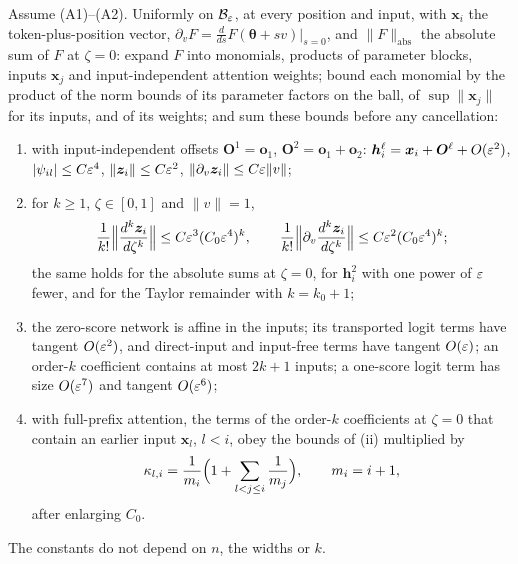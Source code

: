 \begin{proposition}
\label{prop:network}
Assume (A1)--(A2). Uniformly on $\mathcal B_{\varepsilon}$, at every position and input, with $\bm x_i$ the token-plus-position vector,
$\partial_vF=\frac{d}{ds}F(\bm\theta+sv)|_{s=0}$, and $\|F\|_{\mathrm{abs}}$ the absolute sum of $F$ at $\zeta=0$: expand $F$ into monomials, products of
parameter blocks, inputs $\bm x_j$ and input-independent attention weights; bound each monomial by the product of the norm bounds of its
parameter factors on the ball, of $\sup\|\bm x_j\|$ for its inputs, and of its weights; and sum these bounds before any cancellation:
\begin{enumerate}[label=(\roman*),leftmargin=*,itemsep=1pt,topsep=2pt]
\item with input-independent offsets $\bm O^1=\bm o_1$, $\bm O^2=\bm o_1+\bm o_2$: $\bm h_i^\ell=\bm x_i+\bm O^\ell+O(\varepsilon^2)$, $|\psi_{il}|\le C\varepsilon^4$,
$\|\bm z_i\|\le C\varepsilon^2$, $\|\partial_v\bm z_i\|\le C\varepsilon\|v\|$;
\item for $k\ge1$, $\zeta\in[0,1]$ and $\|v\|=1$,
\[
 \frac{1}{k!}\Bigl\|\frac{d^k\bm z_i}{d\zeta^k}\Bigr\|\le C\varepsilon^3(C_0\varepsilon^4)^k,\qquad
 \frac{1}{k!}\Bigl\|\partial_v\frac{d^k\bm z_i}{d\zeta^k}\Bigr\|\le C\varepsilon^2(C_0\varepsilon^4)^k;
\]
the same holds for the absolute sums at $\zeta=0$, for $\bm h^2_i$ with one power of $\varepsilon$ fewer, and for the Taylor remainder with $k=k_0+1$;
\item the zero-score network is affine in the inputs; its transported logit terms have tangent $O(\varepsilon^2)$, and direct-input and
input-free terms have tangent $O(\varepsilon)$; an order-$k$ coefficient contains at most $2k+1$ inputs; a one-score logit term has size
$O(\varepsilon^7)$ and tangent $O(\varepsilon^6)$;
\item with full-prefix attention, the terms of the order-$k$ coefficients at $\zeta=0$ that contain an earlier input $\bm x_l$, $l<i$, obey the
bounds of (ii) multiplied by
\begin{equation}
 \kappa_{l,i}=\frac{1}{m_i}\Bigl(1+\sum_{l<j\le i}\frac{1}{m_j}\Bigr),\qquad m_i=i+1,
 \label{eq:dilution}
\end{equation}
after enlarging $C_0$.
\end{enumerate}
The constants do not depend on $n$, the widths or $k$.
\end{proposition}

